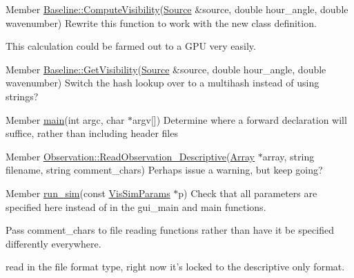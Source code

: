 \label{todo__todo000009}
\hypertarget{todo__todo000009}{}
 
\begin{DoxyDescription}
\item[Member \hyperlink{classBaseline_af5d2d827062aae6eaff5440c60d3d0b4}{Baseline::ComputeVisibility}(\hyperlink{classSource}{Source} \&source, double hour\_\-angle, double wavenumber) ]Rewrite this function to work with the new class definition. 

This calculation could be farmed out to a GPU very easily. 
\end{DoxyDescription}

\label{todo__todo000005}
\hypertarget{todo__todo000005}{}
 
\begin{DoxyDescription}
\item[Member \hyperlink{classBaseline_a817d0c4e83714b68efcc7fb7fdac9a02}{Baseline::GetVisibility}(\hyperlink{classSource}{Source} \&source, double hour\_\-angle, double wavenumber) ]Switch the hash lookup over to a multihash instead of using strings? 
\end{DoxyDescription}

\label{todo__todo000015}
\hypertarget{todo__todo000015}{}
 
\begin{DoxyDescription}
\item[Member \hyperlink{main_8cpp_a0ddf1224851353fc92bfbff6f499fa97}{main}(int argc, char $\ast$argv\mbox{[}\mbox{]}) ]Determine where a forward declaration will suffice, rather than including header files 
\end{DoxyDescription}

\label{todo__todo000011}
\hypertarget{todo__todo000011}{}
 
\begin{DoxyDescription}
\item[Member \hyperlink{classObservation_aa2ee58b5ea31a94720e891eef7554898}{Observation::ReadObservation\_\-Descriptive}(\hyperlink{classArray}{Array} $\ast$array, string filename, string comment\_\-chars) ]Perhaps issue a warning, but keep going? 
\end{DoxyDescription}

\label{todo__todo000017}
\hypertarget{todo__todo000017}{}
 
\begin{DoxyDescription}
\item[Member \hyperlink{oifits__sim_8h_a605cac6d1c5a57adc6806b0e3a6a4db7}{run\_\-sim}(const \hyperlink{classVisSimParams}{VisSimParams} $\ast$p) ]Check that all parameters are specified here instead of in the gui\_\-main and main functions. 

Pass comment\_\-chars to file reading functions rather than have it be specified differently everywhere. 

read in the file format type, right now it's locked to the descriptive only format. 
\end{DoxyDescription}

